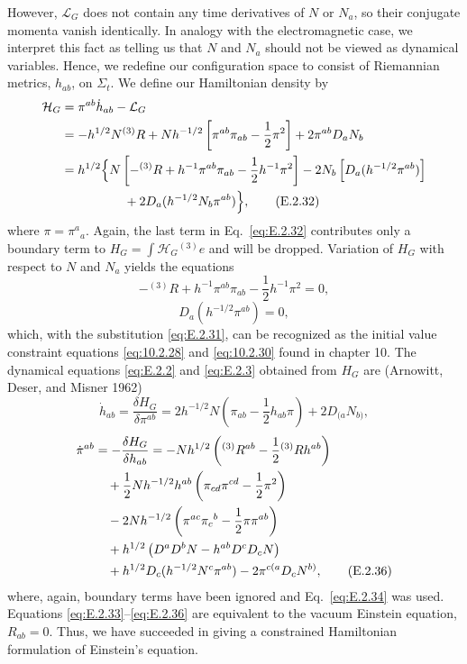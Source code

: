 However, \(\mathcal L_G\) does not contain any time derivatives of \(N\) or \(N_a\),
so their conjugate momenta vanish identically. In analogy with the electromagnetic
case, we interpret this fact as telling us that \(N\) and \(N_a\) should not be
viewed as dynamical variables. Hence, we redefine our configuration space to consist
of Riemannian metrics, \(h_{ab}\), on \(\Sigma_t\). We define our Hamiltonian
density by
\begin{align}
  \mathcal H_G
    &=\pi^{ab}\dot h_{ab}-\mathcal L_G\notag\\
    &=-h^{1/2}N{}^{(3)}R
      +Nh^{-1/2}\left[\pi^{ab}\pi_{ab}-\frac{1}{2}\pi^2\right]
      +2\pi^{ab}D_aN_b\notag\\
    &=h^{1/2}\Bigl\{
      N\left[-{}^{(3)}R+h^{-1}\pi^{ab}\pi_{ab}
        -\frac{1}{2}h^{-1}\pi^2\right]
      -2N_b\left[D_a(h^{-1/2}\pi^{ab})\right]\notag\\
    &\hspace{5em}+2D_a(h^{-1/2}N_b\pi^{ab})\Bigr\},
  \tag{E.2.32}\label{eq:E.2.32}
\end{align}
where \(\pi=\pi^a{}_a\). Again, the last term in Eq.~\eqref{eq:E.2.32} contributes
only a boundary term to \(H_G=\int\mathcal H_G{}^{(3)}e\) and will be dropped.
Variation of \(H_G\) with respect to \(N\) and \(N_a\) yields the equations
\begin{equation}
  -{}^{(3)}R+h^{-1}\pi^{ab}\pi_{ab}
    -\frac{1}{2}h^{-1}\pi^2=0,
  \tag{E.2.33}\label{eq:E.2.33}
\end{equation}
\begin{equation}
  D_a(h^{-1/2}\pi^{ab})=0,
  \tag{E.2.34}\label{eq:E.2.34}
\end{equation}
which, with the substitution \eqref{eq:E.2.31}, can be recognized as the initial
value constraint equations \eqref{eq:10.2.28} and \eqref{eq:10.2.30} found in
chapter 10. The dynamical equations \eqref{eq:E.2.2} and \eqref{eq:E.2.3}
obtained from \(H_G\) are (Arnowitt, Deser, and Misner 1962)
\begin{equation}
  \dot h_{ab}=\frac{\delta H_G}{\delta\pi^{ab}}
    =2h^{-1/2}N\left(\pi_{ab}-\frac{1}{2}h_{ab}\pi\right)
      +2D_{(a}N_{b)},
  \tag{E.2.35}\label{eq:E.2.35}
\end{equation}
\begin{align}
  \dot\pi^{ab}
    &=-\frac{\delta H_G}{\delta h_{ab}}
      =-Nh^{1/2}\left({}^{(3)}R^{ab}
        -\frac{1}{2}{}^{(3)}Rh^{ab}\right)\notag\\
    &\quad+\frac{1}{2}Nh^{-1/2}h^{ab}
      \left(\pi_{cd}\pi^{cd}-\frac{1}{2}\pi^2\right)\notag\\
    &\quad-2Nh^{-1/2}
      \left(\pi^{ac}\pi_c{}^b-\frac{1}{2}\pi\pi^{ab}\right)\notag\\
    &\quad+h^{1/2}\left(D^aD^bN-h^{ab}D^cD_cN\right)\notag\\
    &\quad+h^{1/2}D_c(h^{-1/2}N^c\pi^{ab})
      -2\pi^{c(a}D_cN^{b)},
  \tag{E.2.36}\label{eq:E.2.36}
\end{align}
where, again, boundary terms have been ignored and Eq.~\eqref{eq:E.2.34} was used.
Equations \eqref{eq:E.2.33}--\eqref{eq:E.2.36} are equivalent to the vacuum
Einstein equation, \(R_{ab}=0\). Thus, we have succeeded in giving a constrained
Hamiltonian formulation of Einstein's equation.

